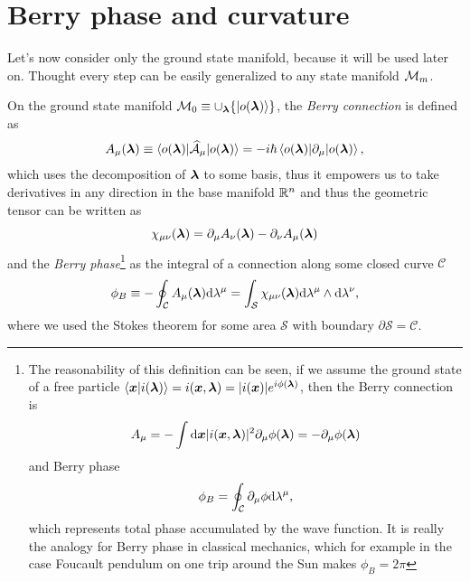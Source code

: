 \section{Berry phase and curvature}
Let's now consider only the ground state manifold, because it will be used later on. Thought every step can be easily generalized to any state manifold $\mathcal{M}_m$.

On the ground state manifold $\mathcal{M}_0\equiv \cup_{\bm\lambda} \{\ket{o({\bm\lambda})}\}$, the \emph{Berry connection} is defined as
\begin{equation}
    A_\mu({\bm\lambda})\equiv \braket{o({\bm\lambda})|\mathcal{\widehat{A}}_\mu|o({\bm\lambda})}=-i\hbar \braket{o({\bm\lambda})|\partial_\mu|o({\bm\lambda})},
    \label{eq:berryConnection}
\end{equation}
which uses the decomposition of ${\bm\lambda}$ to some basis, thus it empowers us to take derivatives in any direction in the base manifold $\mathbb{R}^n$ and thus the geometric tensor can be written as
\begin{equation}
    \chi_{\mu\nu}({\bm\lambda}) = \partial_\mu A_\nu({\bm\lambda})-\partial_\nu A_\mu({\bm\lambda})
\end{equation}
and the \emph{Berry phase}\footnote{
    The reasonability of this definition can be seen, if we assume the ground state of a free particle
        $\braket{\bm{x}|i({\bm\lambda})}=i(\bm{x},{\bm\lambda})= |i(\bm{x})|e^{i\phi({\bm\lambda})}$,
    then the Berry connection is
    \begin{equation}
        A_\mu=-\int \mathrm{d} \bm{x}|i(\bm{x},{\bm\lambda})|^2\partial_\mu \phi({\bm\lambda}) = -\partial_\mu \phi({\bm\lambda})
    \end{equation} 
    and Berry phase
    \begin{equation}
        \phi_B=\oint_\mathcal{C} \partial_\mu \phi \mathrm{d} \lambda^\mu,
    \end{equation}
    which represents total phase accumulated by the wave function. It is really the analogy for Berry phase in classical mechanics, which for example in the case Foucault pendulum on one trip around the Sun makes $\phi_B=2\pi$
}
as the integral of a connection along some closed curve $\mathcal{C}$
\begin{equation}
    \phi_B\equiv-\oint_\mathcal{C} A_\mu({\bm\lambda})\mathrm{d} \lambda^\mu=\int_\mathcal{S} \chi_{\mu\nu}({\bm\lambda})\mathrm{d} \lambda^\mu \wedge \mathrm{d}\lambda^\nu,
\end{equation}
where we used the Stokes theorem for some area $\mathcal{S}$ with boundary $\partial\mathcal{S}=\mathcal{C}$.




